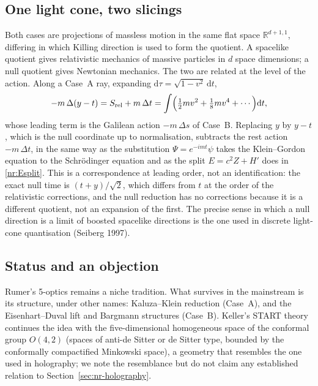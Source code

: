 \subsection{One light cone, two slicings}

Both cases are projections of massless motion in the same flat space
$\mathbb{R}^{d+1,1}$, differing in which Killing direction is used to form the
quotient. A spacelike quotient gives relativistic mechanics of massive particles
in $d$ space dimensions; a null quotient gives Newtonian mechanics. The two are
related at the level of the action. Along a Case~A ray, expanding
$\mathrm{d}\tau=\sqrt{1-v^2}\,\mathrm{d}t$,
\begin{equation}
  -m\,\Delta(y-t)=S_{\rm rel}+m\,\Delta t
  =\int\Bigl(\tfrac12mv^2+\tfrac18mv^4+\cdots\Bigr)\mathrm{d}t ,
  \label{nr:restsub}
\end{equation}
whose leading term is the Galilean action $-m\,\Delta s$ of Case~B. Replacing $y$
by $y-t$, which is the null coordinate up to normalisation, subtracts the rest
action $-m\,\Delta t$, in the same way as the substitution
$\Psi=e^{-imt}\psi$ takes the Klein--Gordon equation to the Schr\"odinger equation
and as the split $E=c^2Z+H'$ does in \eqref{nr:Esplit}. This is a correspondence at
leading order, not an identification: the exact null time is $(t+y)/\sqrt2$,
which differs from $t$ at the order of the relativistic corrections, and the
null reduction has no corrections because it is a different quotient, not an
expansion of the first. The precise sense in which a null direction is a limit
of boosted spacelike directions is the one used in discrete light-cone
quantisation (Seiberg 1997).

\subsection{Status and an objection}

Rumer's 5-optics remains a niche tradition. What survives in the mainstream is
its structure, under other names: Kaluza--Klein reduction (Case~A), and the
Eisenhart--Duval lift and Bargmann structures (Case~B). Keller's START theory
continues the idea with the five-dimensional homogeneous space of the conformal
group $O(4,2)$ (spaces of anti-de Sitter or de Sitter type, bounded by the
conformally compactified Minkowski space), a geometry that resembles the one used in
holography; we note the resemblance but do not claim any established
relation to Section~\ref{sec:nr-holography}.


